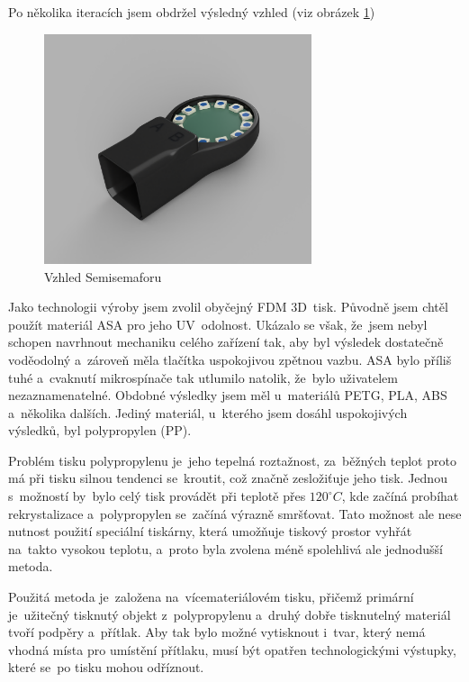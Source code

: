 Po několika iteracích jsem obdržel výsledný vzhled (viz obrázek \ref{Semisemafor-box-render})
\begin{figure}[!h]
  \begin{center}
    \includegraphics[width=0.7\textwidth]{text/PraktickaCast/img/Semisemafor-BOX-render.png}
  \end{center}
  \caption{Vzhled Semisemaforu}
  \label{Semisemafor-box-render}
\end{figure}

Jako technologii výroby jsem zvolil obyčejný FDM 3D~tisk.
Původně jsem chtěl použít materiál ASA pro jeho UV~odolnost.
Ukázalo se však, že~jsem nebyl schopen navrhnout mechaniku celého zařízení tak, aby byl výsledek dostatečně voděodolný a~zároveň měla tlačítka uspokojivou zpětnou vazbu.
ASA bylo příliš tuhé a~cvaknutí mikrospínače tak utlumilo natolik, že~bylo uživatelem nezaznamenatelné.
Obdobné výsledky jsem měl u~materiálů PETG, PLA, ABS a~několika dalších.
Jediný materiál, u~kterého jsem dosáhl uspokojivých výsledků, byl polypropylen (PP).

Problém tisku polypropylenu je~jeho tepelná roztažnost, za~běžných teplot proto má při tisku silnou tendenci se~kroutit, což značně zesložiťuje jeho tisk.
Jednou s~možností by~bylo celý tisk provádět při teplotě přes \(120^\circ C\), kde začíná probíhat rekrystalizace a~polypropylen se~začíná výrazně smršťovat.
Tato možnost ale nese nutnost použití speciální tiskárny, která umožňuje tiskový prostor vyhřát na~takto vysokou teplotu, a~proto byla zvolena méně spolehlivá ale jednodušší metoda.

Použitá metoda je~založena na~vícemateriálovém tisku, přičemž primární je~užitečný tisknutý objekt z~polypropylenu a~druhý dobře tisknutelný materiál tvoří podpěry a~přítlak.
Aby tak bylo možné vytisknout i~tvar, který nemá vhodná místa pro umístění přítlaku, musí být opatřen technologickými výstupky, které se~po tisku mohou odříznout.

